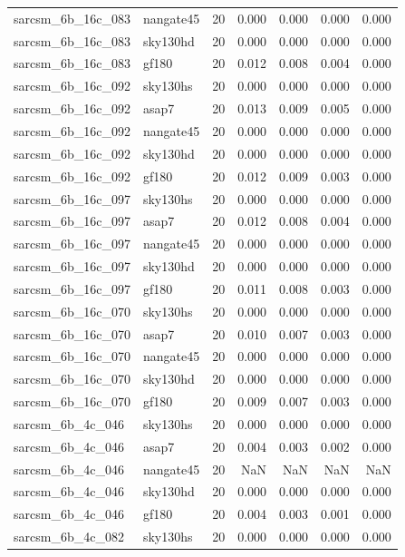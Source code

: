 \begin{tabular}{llrrrrr}
sarcsm\_6b\_16c\_083 & nangate45 & 20 & 0.000 & 0.000 & 0.000 & 0.000 \\
sarcsm\_6b\_16c\_083 & sky130hd & 20 & 0.000 & 0.000 & 0.000 & 0.000 \\
sarcsm\_6b\_16c\_083 & gf180 & 20 & 0.012 & 0.008 & 0.004 & 0.000 \\
sarcsm\_6b\_16c\_092 & sky130hs & 20 & 0.000 & 0.000 & 0.000 & 0.000 \\
sarcsm\_6b\_16c\_092 & asap7 & 20 & 0.013 & 0.009 & 0.005 & 0.000 \\
sarcsm\_6b\_16c\_092 & nangate45 & 20 & 0.000 & 0.000 & 0.000 & 0.000 \\
sarcsm\_6b\_16c\_092 & sky130hd & 20 & 0.000 & 0.000 & 0.000 & 0.000 \\
sarcsm\_6b\_16c\_092 & gf180 & 20 & 0.012 & 0.009 & 0.003 & 0.000 \\
sarcsm\_6b\_16c\_097 & sky130hs & 20 & 0.000 & 0.000 & 0.000 & 0.000 \\
sarcsm\_6b\_16c\_097 & asap7 & 20 & 0.012 & 0.008 & 0.004 & 0.000 \\
sarcsm\_6b\_16c\_097 & nangate45 & 20 & 0.000 & 0.000 & 0.000 & 0.000 \\
sarcsm\_6b\_16c\_097 & sky130hd & 20 & 0.000 & 0.000 & 0.000 & 0.000 \\
sarcsm\_6b\_16c\_097 & gf180 & 20 & 0.011 & 0.008 & 0.003 & 0.000 \\
sarcsm\_6b\_16c\_070 & sky130hs & 20 & 0.000 & 0.000 & 0.000 & 0.000 \\
sarcsm\_6b\_16c\_070 & asap7 & 20 & 0.010 & 0.007 & 0.003 & 0.000 \\
sarcsm\_6b\_16c\_070 & nangate45 & 20 & 0.000 & 0.000 & 0.000 & 0.000 \\
sarcsm\_6b\_16c\_070 & sky130hd & 20 & 0.000 & 0.000 & 0.000 & 0.000 \\
sarcsm\_6b\_16c\_070 & gf180 & 20 & 0.009 & 0.007 & 0.003 & 0.000 \\
sarcsm\_6b\_4c\_046 & sky130hs & 20 & 0.000 & 0.000 & 0.000 & 0.000 \\
sarcsm\_6b\_4c\_046 & asap7 & 20 & 0.004 & 0.003 & 0.002 & 0.000 \\
sarcsm\_6b\_4c\_046 & nangate45 & 20 & NaN & NaN & NaN & NaN \\
sarcsm\_6b\_4c\_046 & sky130hd & 20 & 0.000 & 0.000 & 0.000 & 0.000 \\
sarcsm\_6b\_4c\_046 & gf180 & 20 & 0.004 & 0.003 & 0.001 & 0.000 \\
sarcsm\_6b\_4c\_082 & sky130hs & 20 & 0.000 & 0.000 & 0.000 & 0.000 \\

\end{tabular}

